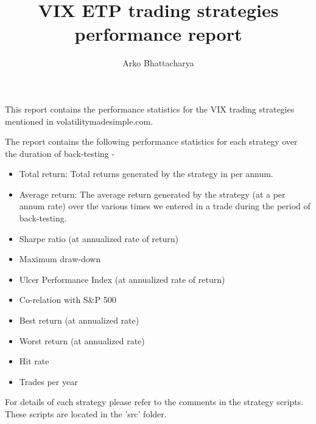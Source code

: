 \documentclass[12pt,a4paper, openany]{article}
\title{VIX ETP trading strategies performance report}
\author{Arko Bhattacharya}
\begin{document}
\maketitle
\thispagestyle{empty}

This report contains the performance statistics for the VIX trading
strategies mentioned in volatilitymadesimple.com.

The report contains the following performance statistics for each
strategy over the duration of back-testing -
\begin{itemize}
\item Total return: Total returns generated by the strategy in per
  annum.
\item Average return: The average return generated by the strategy (at
  a per annum rate) over the various times we entered in a trade
  during the period of back-testing.
\item Sharpe ratio (at annualized rate of return)
\item Maximum draw-down
\item Ulcer Performance Index (at annualized rate of return)
\item Co-relation with S\&P 500
\item Best return (at annualized rate)
\item Worst return (at annualized rate)
\item Hit rate
\item Trades per year
\end{itemize}

For details of each strategy please refer to the comments in the
strategy scripts. These scripts are located in the 'src' folder.

\newpage
\end{document}
